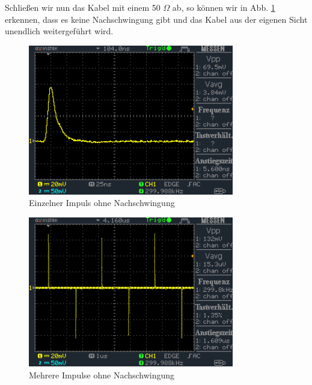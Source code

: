 \documentclass[a4paper,10pt]{article}
\numberwithin{equation}{section}
\begin{document}
Schließen wir nun das Kabel mit einem 50 $\Omega$ ab, so können wir in Abb. \ref{fig:3.4} erkennen, dass es keine Nachschwingung gibt und das Kabel aus der eigenen Sicht unendlich weitergeführt wird. 
\begin{figure}[h]
        \centering
        \includegraphics[width=0.8\textwidth]{data/DS0019.BMP.png}
        \caption{Einzelner Impuls ohne Nachschwingung}
		\label{fig:3.4}
\end{figure}
\begin{figure}[h]
        \centering
        \includegraphics[width=0.8\textwidth]{data/DS0020.BMP.png}
        \caption{Mehrere Impulse ohne Nachschwingung}
		\label{fig:3.5}
\end{figure}
\end{document}
